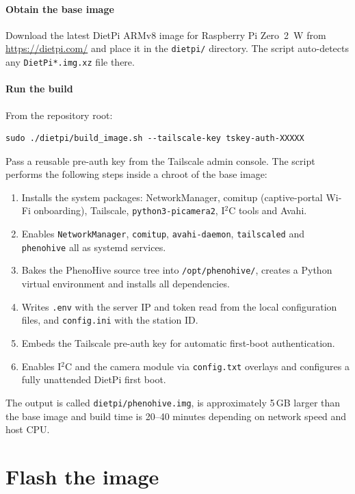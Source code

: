 \paragraph{Obtain the base image} Download the latest DietPi ARMv8 image for Raspberry Pi Zero~2~W from \url{https://dietpi.com/} and place it in the \texttt{dietpi/} directory. The script auto-detects any \texttt{DietPi*.img.xz} file there.

\paragraph{Run the build} From the repository root:
\begin{verbatim}
sudo ./dietpi/build_image.sh --tailscale-key tskey-auth-XXXXX
\end{verbatim}

Pass a reusable pre-auth key from the Tailscale admin console. The script performs the following steps inside a chroot of the base image:
\begin{enumerate}
    \item Installs the system packages: NetworkManager, comitup (captive-portal Wi-Fi onboarding), Tailscale, \texttt{python3-picamera2}, I$^2$C tools and Avahi.
    \item Enables \texttt{NetworkManager}, \texttt{comitup}, \texttt{avahi-daemon}, \texttt{tailscaled} and \texttt{phenohive} all as systemd services.
    \item Bakes the PhenoHive source tree into \texttt{/opt/phenohive/}, creates a Python virtual environment and installs all dependencies.
    \item Writes \texttt{.env} with the server IP and token read from the local configuration files, and \texttt{config.ini} with the station ID.
    \item Embeds the Tailscale pre-auth key for automatic first-boot authentication.
    \item Enables I$^2$C and the camera module via \texttt{config.txt} overlays and configures a fully unattended DietPi first boot.
\end{enumerate}

The output is called \texttt{dietpi/phenohive.img}, is approximately 5\,GB larger than the base image and build time is 20--40 minutes depending on network speed and host CPU.

\section{Flash the image}

